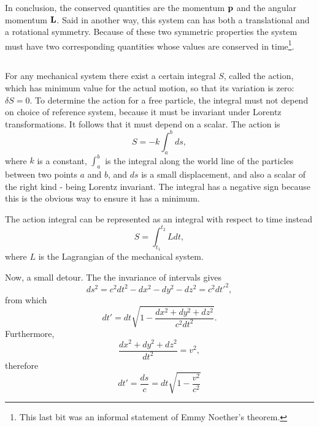 \documentclass[11pt]{amsart}
\begin{document}
In conclusion, the conserved quantities are the momentum $\vb{p}$ and the angular momentum $\vb{L}$. Said in another way, this system can has both a translational and a rotational symmetry. Because of these two symmetric properties the system must have two corresponding quantities whose values are conserved in time\footnote{This last bit was an informal statement of Emmy Noether's theorem.}.

\subsection{}
For any mechanical system there exist a certain integral $S$, called the action, which has minimum value for the actual motion, so that its variation is zero: $\delta S = 0$. To determine the action for a free particle, the integral must not depend on choice of reference system, because it must be invariant under Lorentz transformations. It follows that it must depend on a scalar. The action is
\begin{equation}
\label{eq:action1}
S = -k \int_a^b ds,
\end{equation}
where $k$ is a constant, $\int_a^b$ is the integral along the world line of the particles between two points $a$ and $b$, and $ds$ is a small displacement, and also a scalar of the right kind - being Lorentz invariant. The integral has a negative sign because this is the obvious way to ensure it has a minimum. 

The action integral can be represented as an integral with respect to time instead
\begin{equation}
S = \int_{t_1}^{t_2} Ldt,
\end{equation}
where $L$ is the Lagrangian of the mechanical system.

Now, a small detour. The the invariance of intervals gives
\begin{equation*}
ds^2 = c^2dt^2-dx^2-dy^2-dz^2=c^2dt'^2,
\end{equation*}
from  which
\begin{equation*}
dt' = dt\sqrt{1-\frac{dx^2+dy^2+dz^2}{c^2dt^2}}.
\end{equation*}
Furthermore,
\begin{equation*}
\frac{dx^2 + dy^2+dz^2}{dt^2} = v^2,
\end{equation*}
therefore
\begin{equation}
\label{eq:threetwo}
dt' = \frac{ds}{c} = dt\sqrt{1-\frac{v^2}{c^2}}
\end{equation}
\end{document}
